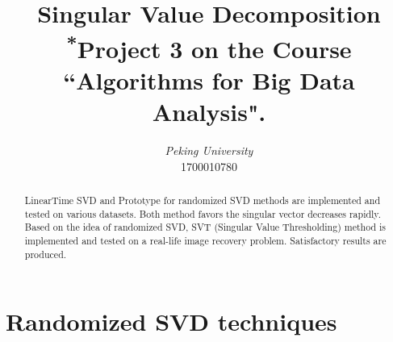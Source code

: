 \documentclass[conference,onecolumn,12pt]{IEEEtran}
\numberwithin{equation}{section}
\numberwithin{figure}{section}
\numberwithin{table}{section}
\theoremstyle{definition}
\begin{document}
\title{Singular Value Decomposition\\
{\footnotesize \textsuperscript{*}Project 3 on the Course ``Algorithms for Big Data Analysis".}
}

\author{
\textit{Peking University}\\
1700010780}
\date{}

\maketitle
\thispagestyle{fancy} %
\lhead{} %
\chead{} %
\rhead{} %
\lfoot{} %
\cfoot{} %
\cfoot{\thepage} %
\renewcommand{\headrulewidth}{0pt} %
\renewcommand{\footrulewidth}{1pt} %
\pagestyle{fancy}
\cfoot{\thepage}

\begin{abstract}
LinearTime SVD and Prototype for randomized SVD methods are implemented and tested on various datasets. Both method favors the singular vector decreases rapidly. Based on the idea of randomized SVD, SVT (Singular Value Thresholding) method is implemented and tested on a real-life image recovery problem. Satisfactory results are produced.
\end{abstract}
\tableofcontents

\newpage
\section{Randomized SVD techniques}
\end{document}
